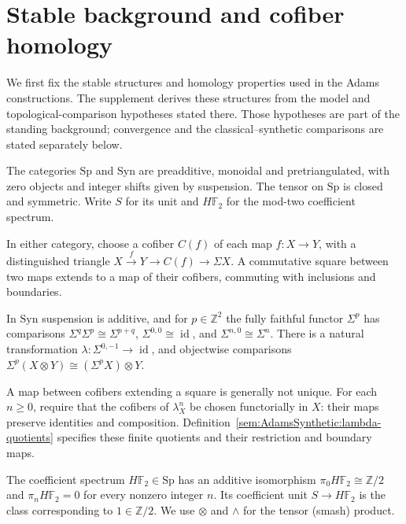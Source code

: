 \section{Stable background and cofiber homology}

We first fix the stable structures and homology properties used in the
Adams constructions. The supplement derives these structures from the
model and topological-comparison hypotheses stated there. Those
hypotheses are part of the standing background; convergence and the
classical--synthetic comparisons are stated separately below.

\begin{definition}
\label{sem:AdamsSynthetic:categories}
The categories $\mathrm{Sp}$ and $\mathrm{Syn}$ are preadditive,
monoidal and pretriangulated, with zero objects and integer shifts given
by suspension.
The tensor on $\mathrm{Sp}$ is closed and symmetric. Write $S$ for its
unit and $H\mathbb F_2$ for the mod-two coefficient spectrum.

In either category, choose a cofiber $C(f)$ of each map
$f\colon X\to Y$, with a distinguished triangle
$X\xrightarrow{f}Y\to C(f)\to\Sigma X$. A commutative square
between two maps extends to a map of their cofibers, commuting with
inclusions and boundaries.

In $\mathrm{Syn}$ suspension is additive, and for $p\in\mathbb Z^2$ the fully faithful functor $\Sigma^p$ has comparisons $\Sigma^q\Sigma^p\cong\Sigma^{p+q}$, $\Sigma^{0,0}\cong\operatorname{id}$, and $\Sigma^{n,0}\cong\Sigma^n$. There is a natural transformation $\lambda\colon\Sigma^{0,-1}\to\operatorname{id}$, and objectwise comparisons $\Sigma^p(X\otimes Y)\cong(\Sigma^pX)\otimes Y$.

A map between cofibers extending a square is generally not unique.
For each $n\ge0$, require that the cofibers of $\lambda_X^n$ be chosen
functorially in $X$: their maps preserve identities and composition.
Definition~\ref{sem:AdamsSynthetic:lambda-quotients} specifies these
finite quotients and their restriction and boundary maps.

The coefficient spectrum $H\mathbb F_2\in\mathrm{Sp}$ has an additive isomorphism $\pi_0H\mathbb F_2\cong\mathbb Z/2$ and $\pi_nH\mathbb F_2=0$ for every nonzero integer $n$. Its coefficient unit $S\to H\mathbb F_2$ is the class corresponding to $1\in\mathbb Z/2$. We use $\otimes$ and $\wedge$ for the tensor (smash) product.


\end{definition}
